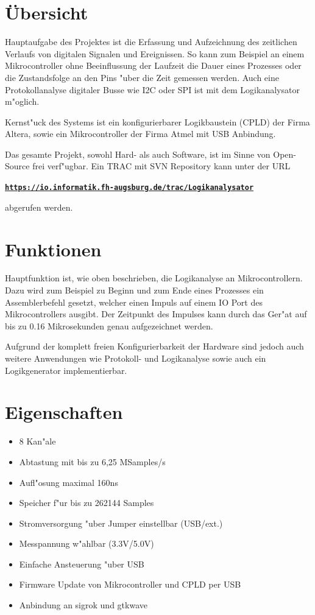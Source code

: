 \documentclass[
a4paper,
]{leaflet}
\begin{document}
\eject

\section{\"Ubersicht}

Hauptaufgabe des Projektes ist die Erfassung und Aufzeichnung des zeitlichen Verlaufs von digitalen Signalen und Ereignissen. So kann zum Beispiel an einem Mikrocontroller ohne Beeinflussung der Laufzeit die Dauer eines Prozesses oder die Zustandsfolge an den Pins "uber die Zeit gemessen werden. Auch eine Protokollanalyse digitaler Busse wie I2C oder SPI ist mit dem Logikanalysator m"oglich.

Kernst"uck des Systems ist ein konfigurierbarer Logikbaustein (CPLD) der Firma Altera, sowie ein Mikrocontroller der Firma Atmel mit USB Anbindung. 

Das gesamte Projekt, sowohl Hard- als auch Software, ist im Sinne von Open-Source frei verf"ugbar. Ein TRAC mit SVN Repository kann unter der URL

{\bf \underline \tt \large https://io.informatik.fh-augsburg.de/trac/Logikanalysator}

abgerufen werden.


\section{Funktionen}

Hauptfunktion ist, wie oben beschrieben, die Logikanalyse an Mikrocontrollern. Dazu wird zum Beispiel zu Beginn und zum Ende eines Prozesses ein Assemblerbefehl gesetzt, welcher einen Impuls auf einem IO Port des Mikrocontrollers ausgibt. Der Zeitpunkt des Impulses kann durch das Ger"at auf bis zu 0.16 Mikrosekunden genau aufgezeichnet werden.

Aufgrund der komplett freien Konfigurierbarkeit der Hardware sind jedoch auch weitere Anwendungen wie Protokoll- und Logikanalyse sowie auch ein Logikgenerator implementierbar.

\section{Eigenschaften}

\begin{itemize}
  \item 8 Kan"ale
  \item Abtastung mit bis zu 6,25 MSamples/s
  \item Aufl"osung maximal 160ns
  \item Speicher f"ur bis zu 262144 Samples
  \item Stromversorgung "uber Jumper einstellbar (USB/ext.)
  \item Messpannung w"ahlbar (3.3V/5.0V)
  \item Einfache Ansteuerung "uber USB
  \item Firmware Update von Mikrocontroller und CPLD per USB
  \item Anbindung an sigrok und gtkwave
\end{itemize}
\end{document}
